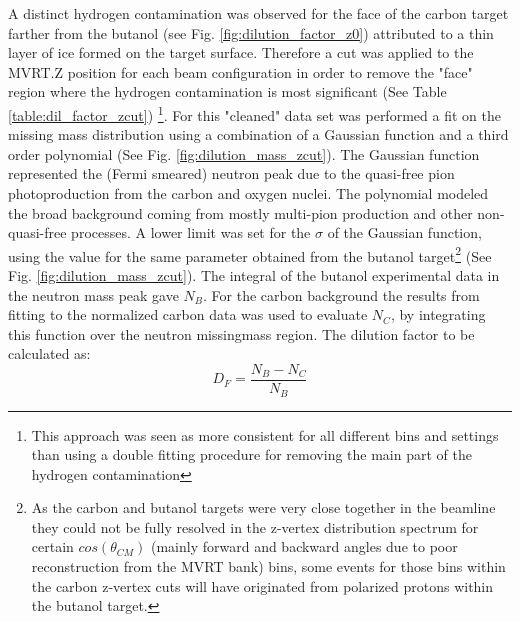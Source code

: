 A distinct hydrogen contamination was observed for the face of the carbon target farther from the butanol (see Fig. \ref{fig:dilution_factor_z0}) attributed to a thin layer of ice formed on the target surface. Therefore a cut was applied to the MVRT.Z position for each beam configuration in order to remove the "face" region where the hydrogen contamination is most significant (See Table \ref{table:dil_factor_zcut}) \footnote{This approach was seen as more consistent for all different bins and settings than using a double fitting procedure for removing the main part of the hydrogen contamination}. For this "cleaned" data set was performed a fit on the missing mass distribution using a combination of a Gaussian function and a third order polynomial (See Fig. \ref{fig:dilution_mass_zcut}). The Gaussian function represented the (Fermi smeared) neutron peak due to the quasi-free pion photoproduction from the carbon and oxygen nuclei. The polynomial modeled the broad background coming from mostly multi-pion production and other non-quasi-free processes.  A lower limit was set for the $\sigma$ of the Gaussian function, using the value for the same parameter obtained from the butanol target\footnote{As the carbon and butanol targets were very close together in the beamline they could not be fully resolved in the z-vertex distribution spectrum for certain $cos(\theta_{CM})$ (mainly forward and backward angles due to poor reconstruction from the MVRT bank) bins, some events for those bins within the carbon z-vertex cuts will have originated from polarized protons within the butanol target.} (See Fig. \ref{fig:dilution_mass_zcut}). The integral of the butanol experimental data in the neutron mass peak gave $N_B$. For the carbon background the results from fitting to the normalized carbon data was used to evaluate $N_C$, by integrating this function over the neutron missingmass region.  The dilution factor to be calculated as:
\begin{equation} \label{eqn:dil_factor}
  D_F = \frac{N_B - N_C}{N_B}
\end{equation}
